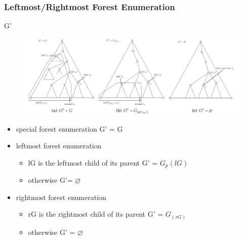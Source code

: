 \documentclass{beamer}
\begin{document}
\begin{frame}
\frametitle{Leftmost/Rightmost Forest Enumeration}
G' 
\begin{figure}
	\includegraphics[width=0.9\linewidth]{Dloop}
	\label{Dloop} 
	\centering
\end{figure}
\begin{itemize}
\item special forest enumeration G' = G
\item leftmost forest enumeration
\begin{itemize}
\item lG is the leftmost child of its parent G' = $G_p(lG)$
\item otherwise G'= $\varnothing$
\end{itemize}
\item rightmost forest enumeration
\begin{itemize}
\item rG is the rightmost child of its parent G' = $G_(rG)$
\item otherwise G' = $\varnothing$
\end{itemize}
\end{itemize}

\end{frame}
\end{document}
